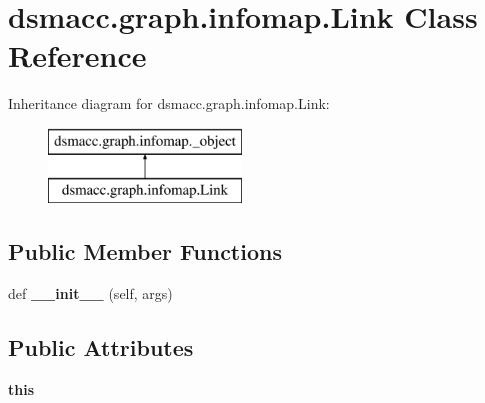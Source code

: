 \hypertarget{classdsmacc_1_1graph_1_1infomap_1_1Link}{}\section{dsmacc.\+graph.\+infomap.\+Link Class Reference}
\label{classdsmacc_1_1graph_1_1infomap_1_1Link}
Inheritance diagram for dsmacc.\+graph.\+infomap.\+Link\+:\begin{figure}[H]
\begin{center}
\leavevmode
\includegraphics[height=2.000000cm]{classdsmacc_1_1graph_1_1infomap_1_1Link}
\end{center}
\end{figure}
\subsection*{Public Member Functions}
\begin{DoxyCompactItemize}
\item 
\mbox{\label{classdsmacc_1_1graph_1_1infomap_1_1Link_adb8cf1fc4e560837dd186550f5bd9fc3}} 
def {\bfseries \+\_\+\+\_\+init\+\_\+\+\_\+} (self, args)
\end{DoxyCompactItemize}
\subsection*{Public Attributes}
\begin{DoxyCompactItemize}
\item 
\mbox{\label{classdsmacc_1_1graph_1_1infomap_1_1Link_a0d6da02170c4c9591c3db2a9ed741866}} 
{\bfseries this}
\end{DoxyCompactItemize}
